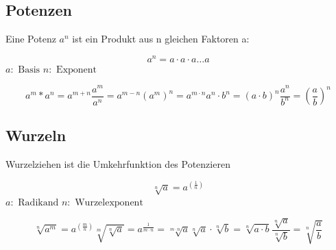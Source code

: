 \subsection{Potenzen}
Eine Potenz $a^n$ ist ein Produkt aus n gleichen Faktoren a:
\begin{shaded}
\begin{equation}
 a^n=a\cdot a \cdot a \ldots a
\end{equation}
$a:\text{ Basis}$ $n:\text{ Exponent}$
\end{shaded}
\begin{shaded}
\begin{subequations}
\begin{equation}
 a^m*a^n=a^{m+n}
\end{equation}
\begin{equation}
\frac{a^m}{a^n}=a^{m-n}
\end{equation} 
\begin{equation}
 \left(a^m\right)^n=a^{m\cdot n}
\end{equation} 
\begin{equation}
 a^n\cdot b^n =\left(a\cdot b\right)^n
\end{equation} 
\begin{equation}
 \frac{a^n}{b^n}=\left(\frac{a}{b}\right)^n
\end{equation}
\end{subequations}
\end{shaded}
\subsection{Wurzeln}
Wurzelziehen ist die Umkehrfunktion des Potenzieren
\begin{shaded}
 \begin{equation}
\sqrt[n]{a}=a^{\left(\frac{1}{n}\right)}
\end{equation}
$a:\text{ Radikand}$ $n:\text{ Wurzelexponent}$  
\end{shaded}
\begin{shaded}
\begin{subequations}
\begin{equation}
 \sqrt[n]{a^m}=a^{\left(\frac{m}{n}\right)}
\end{equation} 
\begin{equation}
 \sqrt[m]{\sqrt[n]{a}}=a^{\frac{1}{m\cdot n}}=\sqrt[m\cdot n]{a}
\end{equation} 
\begin{equation}
 \sqrt[n]{a}\cdot\sqrt[n]{b}=\sqrt[n]{a\cdot b}
\end{equation} 
\begin{equation}
 \frac{\sqrt[n]{a}}{\sqrt[n]{b}}=\sqrt[n]{\frac{a}{b}}
\end{equation} 
\end{subequations}
\end{shaded}

